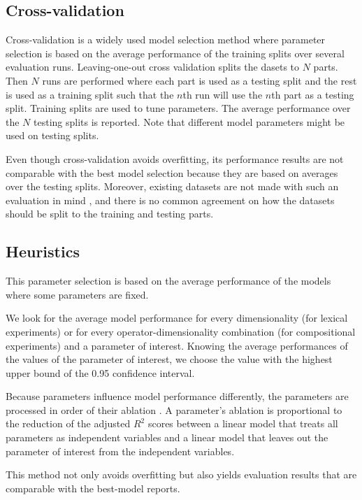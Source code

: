 \subsection{Cross-validation}

Cross-validation \cite{Ney1997} is a widely used model selection method where parameter selection is based on the average performance of the training splits over several evaluation runs. Leaving-one-out cross validation splits the dasets to $N$ parts. Then $N$ runs are performed where each part is used as a testing split and the rest is used as a training split such that the $n$th run will use the $n$th part as a testing split. Training splits are used to tune parameters. The average performance over the $N$ testing splits is reported. Note that different model parameters might be used on testing splits.

Even though cross-validation avoids overfitting, its performance results are not comparable with the best model selection because they are based on averages over the testing splits. Moreover, existing datasets are not made with such an evaluation in mind \cite{W16-2506}, and there is no common agreement on how the datasets should be split to the training and testing parts.

\subsection{Heuristics}

This parameter selection is based on the average performance of the models where some parameters are fixed.

We look for the average model performance for every dimensionality (for lexical experiments) or for every operator-dimensionality combination (for compositional experiments) and a parameter of interest. Knowing the average performances of the values of the parameter of interest, we choose the value with the highest upper bound of the 0.95 confidence interval.

Because parameters influence model performance differently, the parameters are processed in order of their ablation \cite{lapesa2014large}. A parameter's ablation is proportional to the reduction of the adjusted $R^2$ scores between a linear model that treats all parameters as independent variables and a linear model that leaves out the parameter of interest from the independent variables.

This method not only avoids overfitting but also yields evaluation results that are comparable with the best-model reports.

